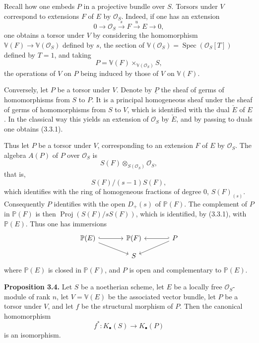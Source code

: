 \documentclass[11pt]{article}
\newcommand{\Spec}{\operatorname{Spec}}
\begin{document}
Recall how one embeds $P$ in a projective bundle over $S$. Torsors under $V$ correspond to extensions $F$ of $E$ by $\mathcal O_S$. Indeed, if one has an extension
\[
0\longrightarrow\mathcal O_S\xrightarrow{s}F\xrightarrow{u}E\longrightarrow 0,
\tag{3.3.1}
\]
one obtains a torsor under $V$ by considering the homomorphism $\mathbb V(F)\to\mathbb V(\mathcal O_S)$ defined by $s$, the section of $\mathbb V(\mathcal O_S)=\Spec(\mathcal O_S[T])$ defined by $T=1$, and taking
\[
 P=\mathbb V(F)\times_{\mathbb V(\mathcal O_S)}S,
\]
the operations of $V$ on $P$ being induced by those of $V$ on $\mathbb V(F)$.

Conversely, let $P$ be a torsor under $V$. Denote by $\underline P$ the sheaf of germs of homomorphisms from $S$ to $P$. It is a principal homogeneous sheaf under the sheaf of germs of homomorphisms from $S$ to $V$, which is identified with the dual $\check E$ of $E$. In the classical way this yields an extension of $\mathcal O_S$ by $\check E$, and by passing to duals one obtains (3.3.1).

Thus let $P$ be a torsor under $V$, corresponding to an extension $F$ of $E$ by $\mathcal O_S$. The algebra $A(P)$ of $P$ over $\mathcal O_S$ is
\[
 S(F)\otimes_{S(\mathcal O_S)}\mathcal O_S,
\]
that is,
\[
 S(F)/(s-1)S(F),
\]
which identifies with the ring of homogeneous fractions of degree $0$, $S(F)_{(s)}$. Consequently $P$ identifies with the open $D_+(s)$ of $\mathbb P(F)$. The complement of $P$ in $\mathbb P(F)$ is then $\operatorname{Proj}(S(F)/sS(F))$, which is identified, by (3.3.1), with $\mathbb P(E)$. Thus one has immersions
\[
\begin{tikzcd}[column sep=large,row sep=small]
\mathbb P(E) \arrow[r,hook] \arrow[dr] & \mathbb P(F) & P \arrow[l,hook'] \arrow[dl]\\
& S &
\end{tikzcd}
\]
where $\mathbb P(E)$ is closed in $\mathbb P(F)$, and $P$ is open and complementary to $\mathbb P(E)$.

\textbf{Proposition 3.4.} Let $S$ be a noetherian scheme, let $E$ be a locally free $\mathcal O_S$-module of rank $n$, let $V=\mathbb V(E)$ be the associated vector bundle, let $P$ be a torsor under $V$, and let $f$ be the structural morphism of $P$. Then the canonical homomorphism
\[
 f^*:K_\bullet(S)\longrightarrow K_\bullet(P)
\]
is an isomorphism.
\end{document}
